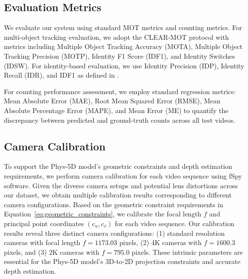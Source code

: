 \subsection{Evaluation Metrics}

We evaluate our system using standard MOT metrics and counting metrics. For multi-object tracking evaluation, we adopt the CLEAR-MOT protocol \cite{bernardin2008evaluating} with metrics including Multiple Object Tracking Accuracy (MOTA), Multiple Object Tracking Precision (MOTP), Identity F1 Score (IDF1), and Identity Switches (IDSW). For identity-based evaluation, we use Identity Precision (IDP), Identity Recall (IDR), and IDF1 as defined in \cite{ristani2016performance}. 

For counting performance assessment, we employ standard regression metrics: Mean Absolute Error (MAE), Root Mean Squared Error (RMSE), Mean Absolute Percentage Error (MAPE), and Mean Error (ME) to quantify the discrepancy between predicted and ground-truth counts across all test videos.

\subsection{Camera Calibration}

To support the Phys-5D model's geometric constraints and depth estimation requirements, we perform camera calibration for each video sequence using fSpy software. Given the diverse camera setups and potential lens distortions across our dataset, we obtain multiple calibration results corresponding to different camera configurations. Based on the geometric constraint requirements in Equation~\ref{eq:geometric_constraints}, we calibrate the focal length $f$ and principal point coordinates $(c_u, c_v)$ for each video sequence. Our calibration results reveal three distinct camera configurations: (1) standard resolution cameras with focal length $f=1173.03$ pixels, (2) 4K cameras with $f=1600.3$ pixels, and (3) 2K cameras with $f=795.0$ pixels. These intrinsic parameters are essential for the Phys-5D model's 3D-to-2D projection constraints and accurate depth estimation.
